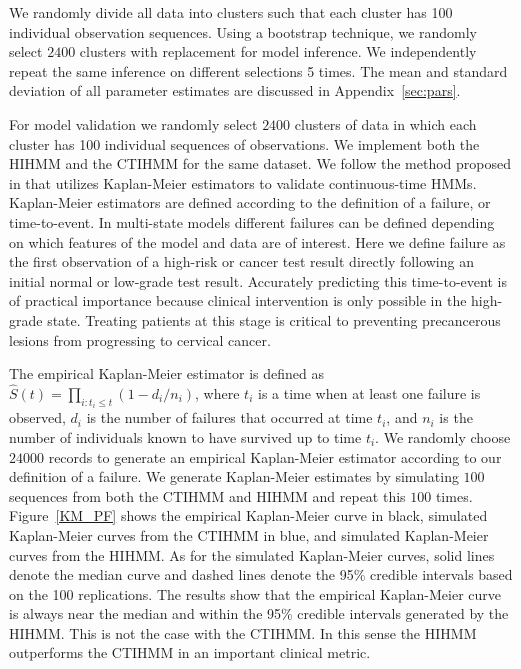 \documentclass{article}
\begin{document}
We randomly divide all data into clusters such that each cluster has 100 individual observation sequences. Using a bootstrap technique, we randomly select $2400$ clusters with replacement for model inference. We independently repeat the same inference on different selections 5 times. The mean and standard deviation of all parameter estimates are discussed in Appendix~\ref{sec:pars}.

For model validation we randomly select $2400$ clusters of data in which each cluster has 100 individual sequences of observations. We implement both the HIHMM and the CTIHMM for the same dataset. We follow the method proposed in \cite{titman_general_2008} that utilizes Kaplan-Meier estimators to validate continuous-time HMMs. Kaplan-Meier estimators are defined according to the definition of a failure, or time-to-event. In multi-state models different failures can be defined depending on which features of the model and data are of interest. Here we define failure as the first observation of a high-risk or cancer test result directly following an initial normal or low-grade test result.  Accurately predicting this time-to-event is of practical importance because clinical intervention is only possible in the high-grade state.  Treating patients at this stage is critical to preventing precancerous lesions from progressing to cervical cancer. 

The empirical Kaplan-Meier estimator is defined as 
$\hat{S}(t) = \prod_{i: t_i\leq t}\left(1 - d_i/n_i\right)$,
where $t_i$ is a time when at least one failure is observed, $d_i$ is the number of failures that occurred at time $t_i$, and $n_i$ is the number of individuals known to have survived up to time $t_i$. We randomly choose $24000$ records to generate an empirical Kaplan-Meier estimator according to our definition of a failure. We generate Kaplan-Meier estimates by simulating $100$ sequences from both the CTIHMM and HIHMM and repeat this $100$ times. Figure~\ref{KM_PF} shows the empirical Kaplan-Meier curve in black, simulated Kaplan-Meier curves from the CTIHMM in blue, and simulated Kaplan-Meier curves from the HIHMM. As for the simulated Kaplan-Meier curves, solid lines denote the median curve and dashed lines denote the 95\% credible intervals based on the 100 replications. The results show that the empirical Kaplan-Meier curve is always near the median and within the 95\% credible intervals generated by the HIHMM. This is not the case with the CTIHMM. In this sense the HIHMM outperforms the CTIHMM in an important clinical metric.
\end{document}
